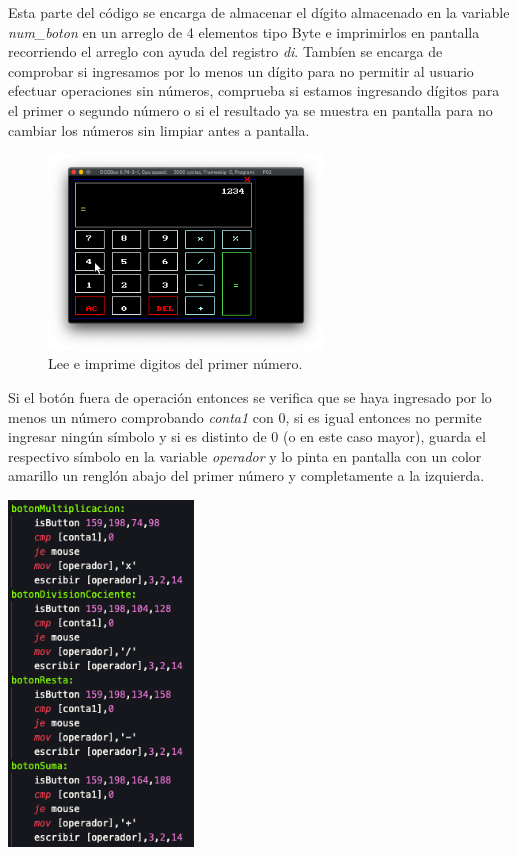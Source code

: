 \documentclass[letterpaper,12 pt,titlepage]{article}
\begin{document}
    Esta parte del código se encarga de almacenar el dígito almacenado en la variable \textit{num\_boton} en un arreglo de 4 elementos tipo Byte e imprimirlos en pantalla recorriendo el arreglo con ayuda del registro \textit{di}. Tambíen se encarga de comprobar si ingresamos por lo menos un dígito para no permitir al usuario efectuar operaciones sin números, comprueba si estamos ingresando dígitos para el primer o segundo número o si el resultado ya se muestra en pantalla para no cambiar los números sin limpiar antes a pantalla.

    \begin{figure}[H]
    \centering
    \includegraphics[width=0.65\textwidth]{img/21.png}
    \caption{Lee e imprime digitos del primer número.}
    \end{figure}

    Si el botón fuera de operación entonces se verifica que se haya ingresado por lo menos un número comprobando \textit{conta1} con $0$, si es igual entonces no permite ingresar ningún símbolo y si es distinto de $0$ (o en este caso mayor), guarda el respectivo símbolo en la variable \textit{operador} y lo pinta en pantalla con un color amarillo un renglón abajo del primer número y completamente a la izquierda.

    \begin{center}
        \includegraphics[width=0.37\textwidth]{img/22.png}
    \end{center}
\end{document}
